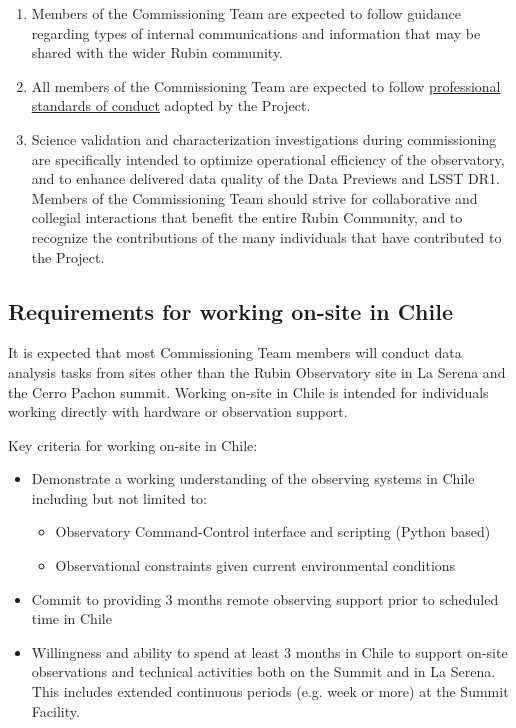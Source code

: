 \documentclass[SE,authoryear,toc,lsstdraft]{lsstdoc}
\begin{document}
\begin{enumerate}
\item Members of the Commissioning Team are expected to follow guidance regarding types of internal communications and information that may be shared with the wider Rubin community.

\item All members of the Commissioning Team are expected to follow \href{https://www.lsst.org/scientists/codes-of-conduct}{professional standards of conduct} adopted by the Project.

\item Science validation and characterization investigations during commissioning are specifically intended to optimize operational efficiency of the observatory, and to enhance delivered data quality of the Data Previews and LSST DR1. Members of the Commissioning Team should strive for collaborative and collegial interactions that benefit the entire Rubin Community, and to recognize the contributions of the many individuals that have contributed to the Project. 

\end{enumerate}

\subsection{Requirements for working on-site in Chile}
\label{chile}

It is expected that most Commissioning Team members will conduct data analysis tasks from sites other than the Rubin Observatory site in La Serena and the Cerro Pachon summit. Working on-site in Chile is intended for individuals working directly with hardware or observation support. 

Key criteria for working on-site in Chile:
\begin{itemize}
\item Demonstrate a working understanding of the observing systems in Chile including but not limited to:
	\begin{itemize}
	\item Observatory Command-Control interface and scripting (Python based)
	\item Observational constraints given current environmental conditions
	\end{itemize}
\item Commit to providing 3 months remote observing support prior to scheduled time in Chile
\item Willingness and ability to spend at least 3 months in Chile to support on-site observations and technical activities both on the Summit and in La Serena. This includes extended continuous periods (e.g. week or more) at the Summit Facility.
\end{itemize}
\end{document}
